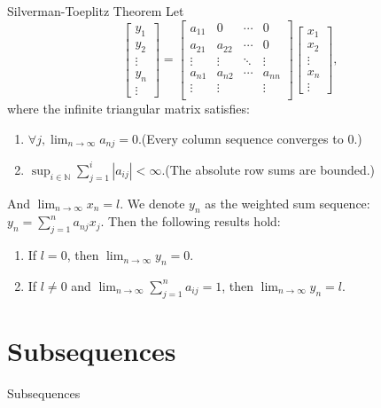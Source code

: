 \documentclass[11pt]{../../TexTemplate/elegantbook}
\begin{document}
\begin{theorem}{Silverman-Toeplitz Theorem}\label{thm:Toeplitz Theorem}
    Let
    \[
        \begin{bmatrix}
        y_1 \\ y_2 \\ \vdots \\ y_n \\ \vdots
        \end{bmatrix}
        =
        \begin{bmatrix}
        a_{11} & 0 & \cdots & 0 \\
        a_{21} & a_{22} & \cdots & 0 \\
        \vdots & \vdots & \ddots & \vdots \\
        a_{n1} & a_{n2} & \cdots & a_{nn} \\
        \vdots & \vdots &        & \vdots \\
        \end{bmatrix}
        \begin{bmatrix}
        x_1 \\  x_2 \\  \vdots \\   x_n \\ \vdots
        \end{bmatrix},
    \]
    where the infinite triangular matrix satisfies:
    \begin{enumerate}
        \item \(\forall j, \lim_{n \to \infty} a_{nj} = 0.\)(Every column sequence converges to \(0\).)
        \item \(\sup_{i\in \mathbb{N}} \sum_{j=1}^{i} \left| a_{ij} \right| < \infty.\)(The absolute row sums are bounded.)
    \end{enumerate}
    And \(\lim_{n \to \infty} x_n = l\).
    We denote \(y_{n}\) as the weighted sum sequence: \(y_{n} = \sum_{j=1}^n a_{nj} x_j\).
    Then the following results hold:
    \begin{enumerate}
        \item If \(l=0\), then  \(\lim_{n \to \infty} y_n = 0\).
        \item If \(l \neq 0\) and \(\lim_{n \to \infty}\sum_{j=1}^{n} a_{ij}=1 \), then \(\lim_{n \to \infty} y_n = l\).
    \end{enumerate}
\end{theorem}




\section{Subsequences}
\begin{leftbarTitle}{Subsequences}\end{leftbarTitle}
\end{document}
